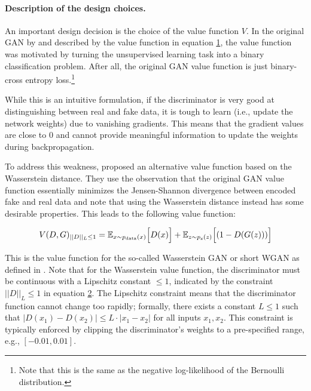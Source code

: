 \paragraph{Description of the design choices.}\label{description-of-the-design-choices.}

An important design decision is the choice of the value function \(V\). In the original GAN by \citet{Goodfellow2014} and described by the value function in equation \hyperref[eq:originalGAN]{1}, the value function was motivated by turning the unsupervised learning task into a binary classification problem. After all, the original GAN value function is just binary-cross entropy loss.\footnote{Note that this is the same as the negative log-likelihood of the
  Bernoulli distribution.}

While this is an intuitive formulation, if the discriminator is very good at distinguishing between real and fake data, it is tough to learn (i.e., update the network weights) due to vanishing gradients. This means that the gradient values are close to \(0\) and cannot provide meaningful information to update the weights during backpropagation.

To address this weakness, \citet{arjovsky2017} proposed an alternative value function based on the Wasserstein distance. They use the observation that the original GAN value function essentially minimizes the Jensen-Shannon divergence between encoded fake and real data and note that using the Wasserstein distance instead has some desirable properties. This leads to the following value function:

\begin{equation}\label{eq:wgan}
V(D,G)_{||D||_L\leq1} = \mathbb{E}_{x \sim p_{\rm data}(x)}\Big[ D(x)\Big] + \mathbb{E}_{z \sim p_{\rm z}(z)}\Big[(1-D(G(z)))\Big]
\end{equation}

This is the value function for the so-called Wasserstein GAN or short WGAN as defined in \citep{arjovsky2017}. Note that for the Wasserstein value function, the discriminator must be continuous with a Lipschitz constant \(\leq 1\), indicated by the constraint \(||D||_L\leq1\) in equation \hyperref[eq:wgan]{2}. The Lipschitz constraint means that the discriminator function cannot change too rapidly; formally, there exists a constant \(L \leq 1\) such that \(|D(x_1) - D(x_2)| \leq L \cdot |x_1 - x_2|\) for all inputs \(x_1, x_2\). This constraint is typically enforced by clipping the discriminator's weights to a pre-specified range, e.g., \([-0.01, 0.01]\).

